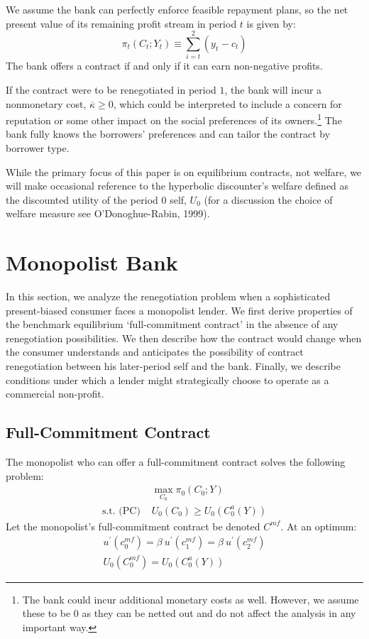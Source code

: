 \documentclass[11pt]{article}%
\begin{document}
We assume the bank can perfectly enforce feasible repayment plans, so the net present value
of its remaining profit stream in period $t$ is given by:
\[
\pi_{t}\left(  C_{t};Y_{t}\right)  \equiv\sum\limits_{i=t}^{2}\left(
y_{t}_{}-c_{t}\right)   
\]
The bank offers a contract if and only
if it can earn non-negative profits.

If the contract were to be renegotiated in period $1$, the bank will incur a
nonmonetary cost, $\overline{\kappa}\geq0$, which could be interpreted to
include a concern for reputation or some other impact on the social
preferences of its owners.\footnote{The bank could incur additional monetary
costs as well. However, we assume these to be $0$ as they can be netted out
and do not affect the analysis in any important way.} The bank fully knows the
borrowers' preferences and can tailor the contract by borrower type.

While the primary focus of this paper is on equilibrium contracts, not
welfare, we will make occasional reference to the hyperbolic discounter's
welfare  defined as the
discounted utility of the period $0$ self, $U_{0}$ (for a discussion the choice of welfare measure see O'Donoghue-Rabin, 1999).


\section{Monopolist Bank}

In this section, we analyze the renegotiation problem when a sophisticated
present-biased consumer faces a monopolist lender. We first derive properties
of the benchmark equilibrium `full-commitment contract' in the absence of any
renegotiation possibilities. We then describe how the contract would change
when the consumer understands and anticipates the possibility of contract
renegotiation between his later-period self and the bank. Finally, we describe
conditions under which a lender might strategically choose to operate as a
commercial non-profit.

\subsection{Full-Commitment Contract}


The monopolist who can offer a full-commitment contract solves the following
problem:
\begin{align*}
&  \max_{C_{0}}\pi_{0}\left(  C_{0};Y\right) \\
\text{s.t. (PC) }  &  U_{0}\left(  C_{0}\right)  \geq U_{0}\left(  C_{0}
^{a}(Y)\right)
\end{align*}
Let the monopolist's full-commitment contract be denoted $C^{mf}$. At an optimum:
\begin{align}
  u^{\prime}\left(  c_{0}^{mf}\right)  =\beta\ u^{\prime}\left(  c_{1}
^{mf}\right)  =\beta\ u^{\prime}\left(  c_{2}^{mf}\right) \label{foc-monop}\\
  U_{0}\left(  C_{0}^{mf}\right)  =U_{0}\left(  C_{0}^{a}(Y)\right)
\label{BPC-monop}
\end{align}
\end{document}
